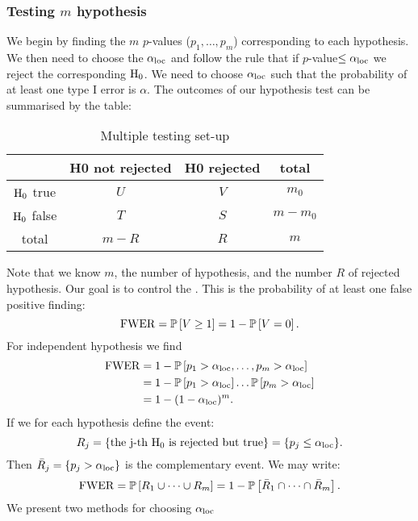 \subsubsection{Testing $m$ hypothesis}
We begin by finding the $m$ $p$-values ($p_1,\dots,p_m$) corresponding to each hypothesis. We then need to choose the  $\alpha_{\mathrm{loc}}$ and follow the rule that if $p$-value$\leq\alpha_{\mathrm{loc}}$ we reject the corresponding $\mathrm{H}_0$. We need to choose $\alpha_{\mathrm{loc}}$ such that the probability of at least one type I error is $\alpha$. The outcomes of our hypothesis test can be summarised by the table:
\begin{table}[htbp]
    \centering
    \caption{Multiple testing set-up}
    \begin{tabular}{cccc}
        \hline
         & H0 not rejected & H0 rejected & total \\
        \hline
        $\mathrm{H}_0$ true  & $U$   & $V$ & $m_0$\\
        $\mathrm{H}_0$ false & $T$   & $S$ & $m-m_0$\\
        total            & $m-R$ & $R$ & $m$\\
        \hline
    \end{tabular}
\end{table}
Note that we know $m$, the number of hypothesis, and the number $R$ of rejected hypothesis. Our goal is to control the . This is the probability of at least one false positive finding:
$$
    \mathrm{FWER} = \mathbb{P}\left[V\geq 1\right] = 1- \mathbb{P}\left[V=0\right].
$$
For independent hypothesis we find
\begin{align*}
    \mathrm{FWER} 
    &= 1- \mathbb{P}\left[p_1>\alpha_{\mathrm{loc}},\dots,p_m>\alpha_{\mathrm{loc}}\right]
    \\&= 1- \mathbb{P}\left[p_1>\alpha_{\mathrm{loc}}\right]\dots\mathbb{P}\left[p_m>\alpha_{\mathrm{loc}}\right]
    \\&= 1- (1-\alpha_{\mathrm{loc}})^m.
\end{align*}
If we for each hypothesis define the event:
$$
    R_j = \{\textrm{the j-th $\mathrm{H}_0$ is rejected but true}\} = \{p_j \leq \alpha_{\mathrm{loc}}\}.
$$
Then $\bar{R}_j=\{p_j > \alpha_{\mathrm{loc}}\}$ is the complementary event. We may write:
\begin{align*}
    \mathrm{FWER} 
    = \mathbb{P}\left[R_1\cup\dots\cup R_m\right] = 1 - \mathbb{P}\left[\bar{R}_1\cap\dots\cap \bar{R}_m\right].
\end{align*}
We present two methods for choosing $\alpha_{\mathrm{loc}}$

